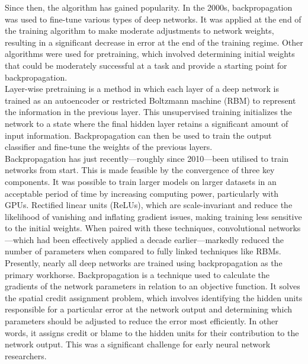 \noindent Since then, the algorithm has gained popularity. In the 2000s, backpropagation was used to fine-tune various types of deep networks. It was applied at the end of the training algorithm to make moderate adjustments to network weights, resulting in a significant decrease in error at the end of the training regime. Other algorithms were used for pretraining, which involved determining initial weights that could be moderately successful at a task and provide a starting point for backpropagation. \\

\noindent Layer-wise pretraining is a method in which each layer of a deep network is trained as an autoencoder or restricted Boltzmann machine (RBM) to represent the information in the previous layer. This unsupervised training initializes the network to a state where the final hidden layer retains a significant amount of input information. Backpropagation can then be used to train the output classifier and fine-tune the weights of the previous layers. \\

\noindent Backpropagation has just recently—roughly since 2010—been utilised to train networks from start. This is made feasible by the convergence of three key components. It was possible to train larger models on larger datasets in an acceptable period of time by increasing computing power, particularly with GPUs. Rectified linear units (ReLUs), which are scale-invariant and reduce the likelihood of vanishing and inflating gradient issues, making training less sensitive to the initial weights. When paired with these techniques, convolutional networks—which had been effectively applied a decade earlier—markedly reduced the number of parameters when compared to fully linked techniques like RBMs. \\

\noindent Presently, nearly all deep networks are trained using backpropagation as the primary workhorse. Backpropagation is a technique used to calculate the gradients of the network parameters in relation to an objective function. It solves the spatial credit assignment problem, which involves identifying the hidden units responsible for a particular error at the network output and determining which parameters should be adjusted to reduce the error most efficiently. In other words, it assigns credit or blame to the hidden units for their contribution to the network output. This was a significant challenge for early neural network researchers.

